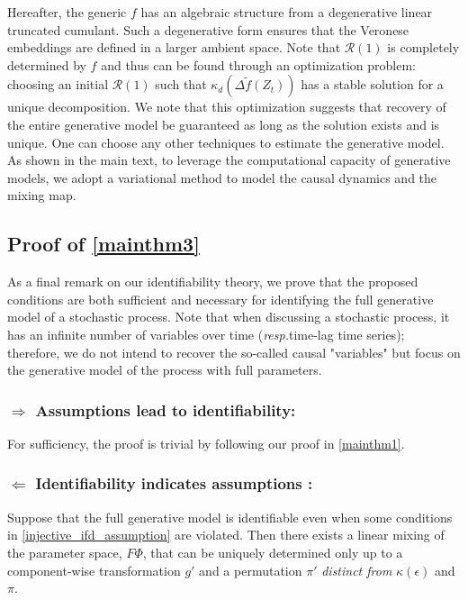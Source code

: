 \documentclass[10pt]{article}
\numberwithin{figure}{section}
\begin{document}
Hereafter, the generic $f$ has an algebraic structure from a degenerative linear truncated cumulant. Such a degenerative form ensures that the Veronese embeddings are defined in a larger ambient space.  Note that $\mathcal{R}(1)$ is completely determined by $f$ and thus can be found through an optimization problem: choosing an initial $\mathcal{R}(1)$ such that $\kappa_d \!\left( \Delta \tilde{f}(Z_t) \right) $ has a stable solution for a unique decomposition. We note that this optimization suggests that recovery of the entire generative model be guaranteed as long as the solution exists and is unique. One can choose any other techniques to estimate the generative model. As shown in the main text, to leverage the computational capacity of generative models, we adopt a variational method to model the causal dynamics and the mixing map.



\subsection{Proof of \autoref{mainthm3}}

As a final remark on our identifiability theory, we prove that the proposed conditions are both sufficient and necessary for identifying the full generative model of a stochastic process. Note that when discussing a stochastic process, it has an infinite number of variables over time (\textit{resp.}time-lag time series); therefore, we do not intend to recover the so-called causal "variables" but focus on the generative model of the process with full parameters.

\subsubsection*{$\Rightarrow$ Assumptions lead to identifiability:}

For sufficiency, the proof is trivial by following our proof in  \autoref{mainthm1}.

\subsubsection*{$\Leftarrow$ Identifiability indicates assumptions :}

Suppose that the full generative model is identifiable even when some conditions in \autoref{injective_ifd_assumption} are violated. Then there exists a linear mixing of the parameter space, $F\Phi$, that can be uniquely determined only up to a component-wise transformation $g'$ and a permutation $\pi'$ 
\textit{distinct from} $\kappa(\epsilon)$ and $\pi$.  
\end{document}
